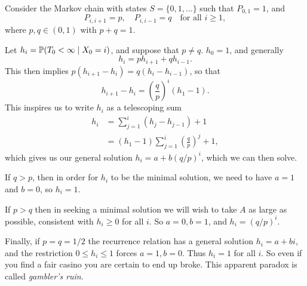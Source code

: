 \documentclass[a4paper]{article}
\begin{document}
\begin{example}
	Consider the Markov chain with states $S = \{0, 1, \dots\}$ such that $P_{0, 1} = 1$, and
	$$
	P_{i, i+1} = p, \quad P_{i, i - 1} = q \quad \text{for all } i \geq 1,
	$$ 
	where $p, q \in (0, 1)$ with $p + q = 1$.

	\begin{center}
    \end{center}

	Let $h_i = {\mathbb{P}}(T_0 < \infty \mid X_0 = i)$, and suppose that $p \neq q$. $h_0 = 1$, and generally
	$$
		h_i = p h_{i + 1} + qh_{i - 1}.
	$$
	This then implies $p(h_{i + 1} - h_i) = q(h_{i} - h_{i - 1})$, so that
	$$
		h_{i+1} - h_{i}  = \left(\frac{q}{p}\right)^i (h_1 - 1).
	$$
	This inspires us to write $h_i$ as a telescoping sum
	\begin{align*}
		h_i &= \sum_{j = 1}^i (h_j - h_{j - 1}) + 1  \\
			&= (h_1 - 1) \sum_{j = 1}^i \left(\frac{q}{p}\right)^j + 1,
	\end{align*}
	which gives us our general solution $h_i = a + b(q/p)^i$, which we can then solve.

	If $q > p$, then in order for $h_i$ to be the minimal solution, we need to have $a = 1$ and $b = 0$, so $h_i = 1$.

    If $p>q$ then in seeking a minimal solution we will wish to take $A$ as large as possible, consistent with $h_{i} \geq 0$ for all $i$. So $a=0,b=1$, and $h_{i}=(q / p)^{i}$.

    Finally, if $p=q=1 / 2$ the recurrence relation has a general solution $h_{i}=a+b i$, and the restriction $0 \leq h_{i} \leq 1$ forces $a=1,b=0$. Thus $h_{i}=1$ for all $i$. So even if you find a fair casino you are certain to end up broke. This apparent paradox is called \textit{gambler's ruin}.
\end{example}
\end{document}
